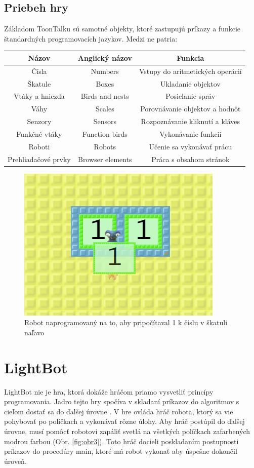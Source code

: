 \documentclass[slovak,a4paper,10pt]{article}
\begin{document}
\subsection{Priebeh hry}
Základom ToonTalku sú samotné objekty, ktoré zastupujú príkazy a funkcie štandardných programovacích jazykov. Medzi ne patria:
\begin{center}
\begin{tabular}{|c|c|c|}
\hline
Názov & Anglický názov & Funkcia \\
\hline
Čísla & Numbers & Vstupy do aritmetických operácií \\
\hline
Škatule & Boxes & Ukladanie objektov \\
\hline
Vtáky a hniezda & Birds and nests & Posielanie správ \\
\hline
Váhy & Scales & Porovnávanie objektov a hodnôt \\
\hline
Senzory & Sensors & Rozpoznávanie kliknutí a kláves \\
\hline
Funkčné vtáky & Function birds & Vykonávanie funkcii \\
\hline
Roboti & Robots & Učenie sa vykonávať prácu \\
\hline
Prehliadačové prvky & Browser elements & Práca s obsahom stránok \\
\hline
\end{tabular}
\end{center}
\begin{figure}[h]
\includegraphics[scale=0.5]{toontalkrobot}
\centering
\caption{Robot naprogramovaný na to, aby pripočítaval 1 k číslu v škatuli naľavo}
\label{fig:obr2}
\end{figure}

\section{LightBot}
LightBot nie je hra, ktorá dokáže hráčom priamo vysvetliť princípy programovania. Jadro tejto hry spočíva v skladaní príkazov do algoritmov s cieľom dostať sa do ďalšej úrovne \cite{combefis2016learning}. V hre ovláda hráč robota, ktorý sa vie pohybovať po políčkach a vykonávať rôzne úlohy. Aby hráč postúpil do ďalšej úrovne, musí pomôcť robotovi zapáliť svetlá na všetkých políčkach zafarbených modrou farbou (Obr. \ref{fig:obr3}). Toto hráč docieli poskladaním postupnosti príkazov do procedúry main, ktoré má robot vykonať aby úspešne dokončil úroveň.
\end{document}
